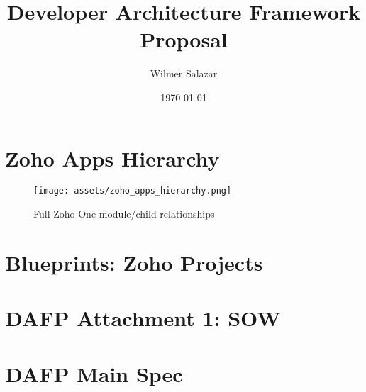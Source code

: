 \documentclass[11pt,a4paper]{scrartcl}
\title{Developer Architecture Framework Proposal}
\author{Wilmer Salazar}
\date{\today}
\begin{document}
\maketitle
\tableofcontents
\clearpage







\clearpage
\appendix

\section{Zoho Apps Hierarchy}
\begin{figure}[h]
  \centering
  \texttt{[image: assets/zoho\_apps\_hierarchy.png]}
  \caption{Full Zoho-One module/child relationships}
\end{figure}

\section{Blueprints: Zoho Projects}


\section{DAFP Attachment 1: SOW}


\section{DAFP Main Spec}

\end{document}
